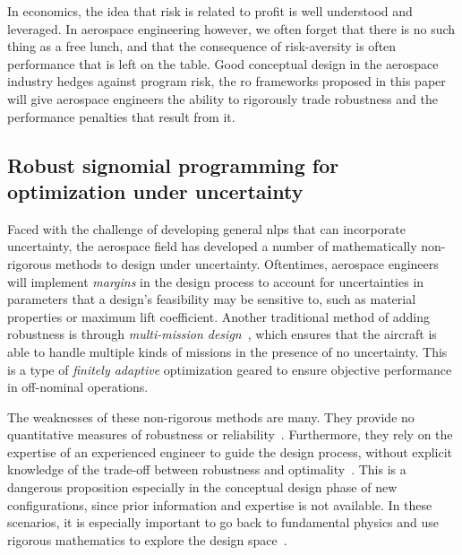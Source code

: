 In economics, the idea that risk is related to profit is well understood and leveraged.
In aerospace engineering however, we often forget that there is no such thing as a free lunch,
and that the consequence of risk-aversity is often performance that is left on the table.
Good conceptual design in the aerospace industry hedges against program risk,
the \gls{ro} frameworks proposed in this paper will
give aerospace engineers the ability to rigorously trade robustness and the performance penalties
that result from it.

\subsection{Robust signomial programming for optimization under uncertainty}

Faced with the challenge of developing general \gls{nlp}s that can incorporate uncertainty,
the aerospace field has developed a number of mathematically non-rigorous methods to
design under uncertainty. Oftentimes, aerospace engineers will implement
\textit{margins} in the design process to account for uncertainties in parameters that a design's feasibility
may be sensitive to, such as material properties or maximum lift coefficient.
Another traditional method of adding robustness is through \textit{multi-mission design}~\cite{York2018},
which ensures that the aircraft is able to handle
multiple kinds of missions in the presence of no uncertainty. This is a type of \textit{finitely
adaptive} optimization geared to ensure objective performance in off-nominal operations.

The weaknesses of these non-rigorous methods are many. They provide no quantitative measures of
robustness or reliability~\cite{Zang2002}. Furthermore, they rely on the expertise of an experienced
engineer to guide the design process, without explicit knowledge of the trade-off between
robustness and optimality~\cite{Yao2011}. This is a dangerous proposition especially in the
conceptual design phase of new configurations, since prior information and expertise is not
available. In these scenarios, it is especially important to go back to fundamental physics
and use rigorous mathematics to explore the design space~\cite{York2018}.

